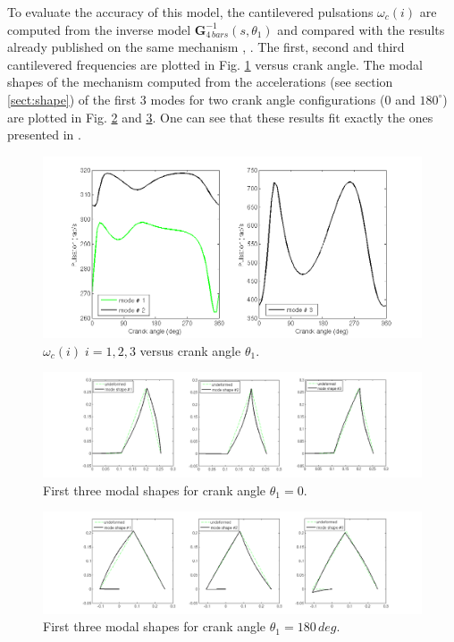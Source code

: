 \documentclass[smallcondensed]{svjour3}     %
\begin{document}
To evaluate the accuracy of this model, the cantilevered pulsations $\omega_c(i)$ are computed from the inverse model $\mathbf{G}_{4\,bars}^{-1}(s,\theta_1)$ and compared with the results already published on the same mechanism \cite{Kitis1990267}, \cite{Turcic1984}. The first, second and third cantilevered frequencies are plotted in Fig. \ref{fig:modes123} versus crank angle. The modal shapes of the mechanism computed from the accelerations (see section \ref{sect:shape}) of the first 3 modes for two crank angle configurations ($0$ and $180^{\circ}$) are plotted in Fig. \ref{fig:shapes0} and \ref{fig:shapes180}. One can see that these results fit exactly the ones presented in \cite{Kitis1990267}.
\begin{figure}[htbp!]
  \includegraphics[width=1\textwidth]{modes123}
\caption{$\omega_{c}(i)\;i=1,2,3$ versus crank angle $\theta_1$.}
\label{fig:modes123} 
\end{figure}
\begin{figure}[htbp!]
  \includegraphics[width=1\textwidth]{shapes0}
\caption{First three modal shapes for crank angle $\theta_1=0$.}
\label{fig:shapes0} 
\end{figure}
\begin{figure}[htbp!]
  \includegraphics[width=1\textwidth]{shapes180}
\caption{First three modal shapes for crank angle $\theta_1=180\,deg$.}
\label{fig:shapes180} 
\end{figure}
\end{document}
